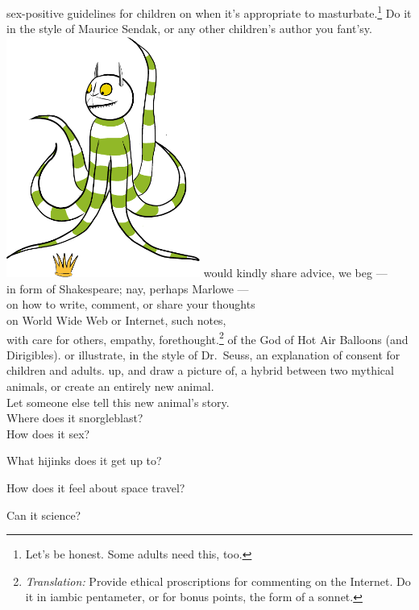 \newpage%
\bversenonum {} sex-positive guidelines for children on when it's appropriate to masturbate.\footnote{Let's be honest. Some adults need this, too.} Do it in the style of Maurice Sendak, or any other children's author you fant'sy.
\newpage
\hfill\includegraphics[width=2.5in]{images/wild_things.pdf}
\newpage%
\bversenonum {} would kindly share advice, we beg --- \\
in form of Shakespeare; nay, perhaps Marlowe ---\\
on how to write, comment, or share your thoughts\\
on World Wide Web or Internet, such notes,\\
with care for others, empathy, forethought.\footnote{\textit{Translation:} Provide ethical proscriptions for commenting on the Internet. Do it in iambic pentameter, or for bonus points, the form of a sonnet.}
\newpage%
\bversenonum {} of the God of Hot Air Balloons (and Dirigibles).
\newpage%
\bversenonum {} or illustrate, in the style of Dr.~Seuss, an explanation of consent for children and adults.
\newpage%
\bversenonum {} up, and draw a picture of, a hybrid between two mythical animals, or create an entirely new animal.
\\
\bverse Let someone else tell this new animal's story.
\\
\bverse Where does it snorgleblast?
\\
\bverse How does it sex?

\bverse What hijinks does it get up to?

\bverse How does it feel about space travel?

\bverse Can it science?

